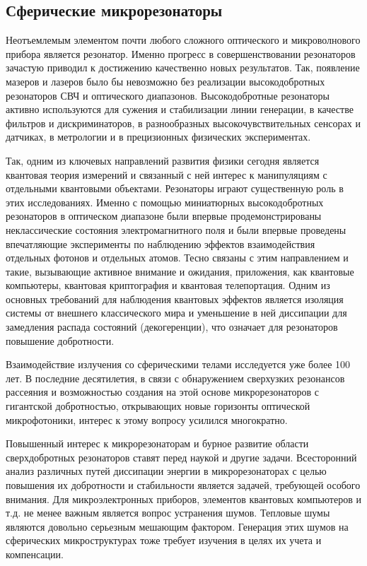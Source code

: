%
%
%
%
%
%

\subsection{Сферические микрорезонаторы}

    Неотъемлемым элементом почти любого сложного оптического и микроволнового прибора является резонатор. Именно прогресс в совершенствовании резонаторов зачастую приводил к достижению качественно новых результатов. Так, появление мазеров и лазеров было бы невозможно без реализации высокодобротных резонаторов СВЧ и оптического диапазонов. Высокодобротные резонаторы активно используются для сужения и стабилизации линии генерации, в качестве фильтров и дискриминаторов, в разнообразных высокочувствительных сенсорах и датчиках, в метрологии и в прецизионных физических экспериментах. \cite{microresonators}

    Так, одним из ключевых направлений развития физики сегодня является квантовая теория измерений и связанный с ней интерес к манипуляциям с отдельными квантовыми объектами. Резонаторы играют существенную роль в этих исследованиях. Именно с помощью миниатюрных высокодобротных резонаторов в оптическом диапазоне были впервые продемонстрированы неклассические состояния электромагнитного поля и были впервые проведены впечатляющие эксперименты по наблюдению эффектов взаимодействия отдельных фотонов и отдельных атомов. Тесно связаны с этим направлением и такие, вызывающие активное внимание и ожидания, приложения, как квантовые компьютеры, квантовая криптография и квантовая телепортация. Одним из основных требований для наблюдения квантовых эффектов является изоляция системы от внешнего классического мира и уменьшение в ней диссипации для замедления распада состояний (декогеренции), что означает для резонаторов повышение добротности. \cite{microresonators}

    Взаимодействие излучения со сферическими телами исследуется уже более 100 лет. В последние десятилетия, в связи с обнаружением сверхузких резонансов рассеяния и возможностью создания на этой основе микрорезонаторов с гигантской добротностью, открывающих новые горизонты оптической микрофотоники, интерес к этому вопросу усилился многократно. \cite{microresonators}

    Повышенный интерес к микрорезонаторам и бурное развитие области сверхдобротных резонаторов ставят перед наукой и другие задачи. Всесторонний анализ различных путей диссипации энергии в микрорезонаторах с целью повышения их добротности и стабильности является задачей, требующей особого внимания. Для микроэлектронных приборов, элементов квантовых компьютеров и т.д. не менее важным является вопрос устранения шумов. Тепловые шумы являются довольно серьезным мешающим фактором. Генерация этих шумов на сферических микроструктурах тоже требует изучения в целях их учета и компенсации.

